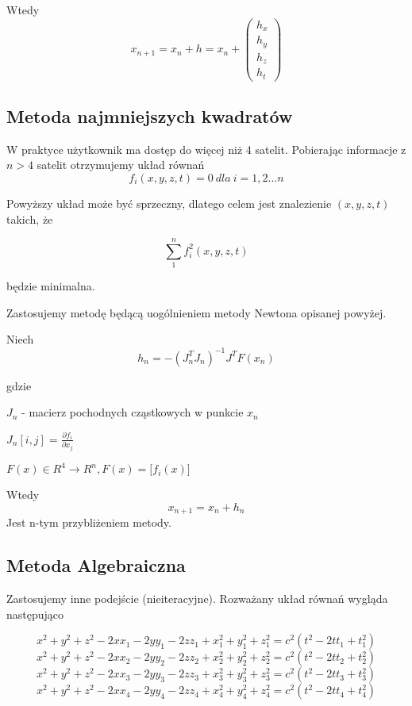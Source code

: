 \documentclass{article}
\begin{document}
Wtedy 
$$
x_{n+1} = x_n + h = x_n + \begin{pmatrix} h_x \\ h_y \\ h_z \\ h_t \end{pmatrix}
$$

	\subsection{Metoda najmniejszych kwadratów}
	W praktyce użytkownik ma dostęp do więcej niż 4 satelit. Pobierając informacje z $n > 4$ satelit otrzymujemy układ równań
	$$ f_{i}(x, y, z, t) = 0 \ dla \ i = 1,2...n $$
	
	Powyższy układ może być sprzeczny, dlatego celem jest znalezienie $ (x, y, z, t) $ takich, że
	
	$$\sum_{1}^{n} f_{i}^2(x, y, z, t) $$ 
	
	będzie minimalna.
	
	Zastosujemy metodę będącą uogólnieniem metody Newtona opisanej powyżej. \newline
	
	Niech
	$$ h_{n} = -(J_{n}^T J_{n})^{-1} J^T F(x_{n})$$

	gdzie \newline
	
	$J_{n}$ - macierz pochodnych cząstkowych w punkcie $x_n$ \newline
	
	$J_{n}[i, j] = \frac{\partial f_i}{\partial x_j} $ \newline
	
	$F(x) \in R^4 \to R^n , F(x) = \big[f_{i}(x)\big]$ \newline

	Wtedy
	$$ x_{n+1} = x_{n} + h_{n} $$
	Jest n-tym przybliżeniem metody.
	
	\subsection{Metoda Algebraiczna}
	
	Zastosujemy inne podejście (nieiteracyjne). Rozważany układ równań wygląda następująco


$$x^2 + y^2 + z^2 -2xx_1 -2yy_1 -2zz_1 + x_1^2 + y_1^2 + z_1^2 = c^2(t^2 -2tt_1 + t_1^2) $$
$$x^2 + y^2 + z^2 -2xx_2 -2yy_2 -2zz_2 + x_2^2 + y_2^2 + z_2^2 = c^2(t^2 -2tt_2 + t_2^2) $$
$$x^2 + y^2 + z^2 -2xx_3 -2yy_3 -2zz_3 + x_3^2 + y_3^2 + z_3^2 = c^2(t^2 -2tt_3 + t_3^2) $$
$$x^2 + y^2 + z^2 -2xx_4 -2yy_4 -2zz_4 + x_4^2 + y_4^2 + z_4^2 = c^2(t^2 -2tt_4 + t_4^2)$$
\end{document}
